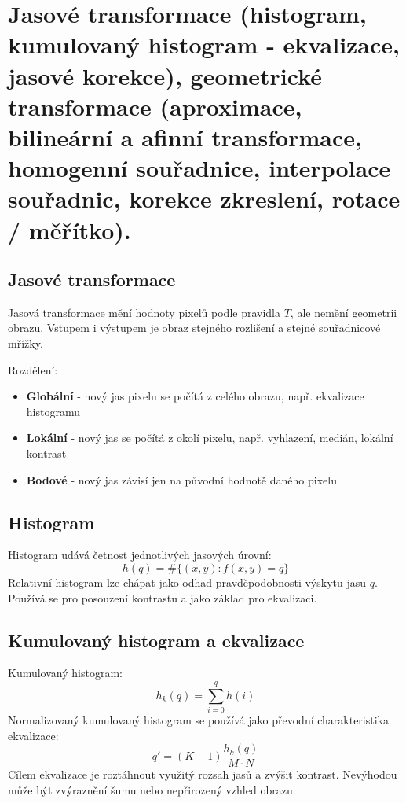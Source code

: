 \newpage

\section{Jasové transformace (histogram, kumulovaný histogram - ekvalizace, jasové korekce), geometrické transformace
(aproximace, bilineární a afinní transformace, homogenní souřadnice, interpolace souřadnic, korekce zkreslení, rotace /
měřítko).}

\subsection*{Jasové transformace}
Jasová transformace mění hodnoty pixelů podle pravidla \(T\), ale nemění geometrii obrazu.
Vstupem i výstupem je obraz stejného rozlišení a stejné souřadnicové mřížky.

Rozdělení:
\begin{itemize}
    \item \textbf{Globální} - nový jas pixelu se počítá z celého obrazu, např. ekvalizace histogramu
    \item \textbf{Lokální} - nový jas se počítá z okolí pixelu, např. vyhlazení, medián, lokální kontrast
    \item \textbf{Bodové} - nový jas závisí jen na původní hodnotě daného pixelu
\end{itemize}

\subsection*{Histogram}
Histogram udává četnost jednotlivých jasových úrovní:
\begin{equation}
    h(q)=\#\{(x,y): f(x,y)=q\}
\end{equation}
Relativní histogram lze chápat jako odhad pravděpodobnosti výskytu jasu \(q\).
Používá se pro posouzení kontrastu a jako základ pro ekvalizaci.

\subsection*{Kumulovaný histogram a ekvalizace}
Kumulovaný histogram:
\begin{equation}
    h_k(q)=\sum_{i=0}^{q}h(i)
\end{equation}
Normalizovaný kumulovaný histogram se používá jako převodní charakteristika ekvalizace:
\begin{equation}
    q' = (K-1)\frac{h_k(q)}{M\cdot N}
\end{equation}
Cílem ekvalizace je roztáhnout využitý rozsah jasů a zvýšit kontrast.
Nevýhodou může být zvýraznění šumu nebo nepřirozený vzhled obrazu.

